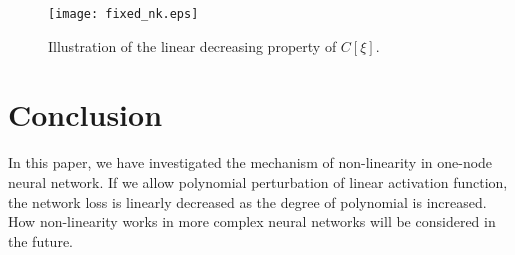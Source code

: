 \documentclass[conference]{IEEEtran}
\begin{document}
\begin{figure}
    \texttt{[image: fixed\_nk.eps]}
    \caption{Illustration of the linear decreasing property of $C[\xi]$.}\label{fig:fixednk}
\end{figure}


\section{Conclusion}\label{sec:con}

In this paper, we have investigated the mechanism of non-linearity in one-node neural network. If we allow polynomial perturbation of linear activation function,
the network loss is linearly decreased as the degree of polynomial is increased. How non-linearity works in more complex neural networks will be considered in the future. 
\end{document}
